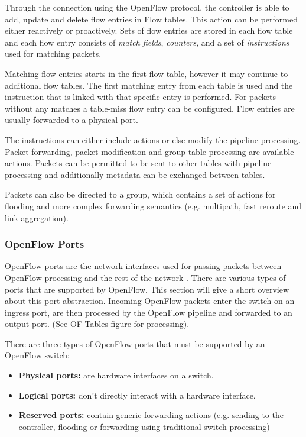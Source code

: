 Through the connection using the OpenFlow protocol, the controller is able to add, update and delete flow entries in Flow tables.  This action can be performed either reactively or proactively. Sets of flow entries are stored in each flow table and each flow entry consists of \textit{match fields}, \textit{counters}, and a set of \textit{instructions} used for matching packets.

Matching flow entries starts in the first flow table, however it may continue to additional flow tables. The first matching entry from each table is used and the instruction that is linked with that specific entry is performed. For packets without any matches a table-miss flow entry can be configured. Flow entries are usually forwarded to a physical port.

The instructions can either include actions or else modify the pipeline processing. Packet forwarding, packet modification and group table processing are available actions. Packets can be permitted to be sent to other tables with pipeline processing and additionally metadata can be exchanged between tables.

Packets can also be directed to a group, which contains a set of actions for flooding and more complex forwarding semantics (e.g. multipath, fast reroute and link aggregation).

\subsubsection{OpenFlow Ports}
OpenFlow ports are the network interfaces used for passing packets between OpenFlow processing and the rest of the network \cite{ofspecification}.
There are various types of ports that are supported by OpenFlow. This section will give a short overview about this port abstraction.
Incoming OpenFlow packets enter the switch on an ingress port, are then processed by the OpenFlow pipeline and forwarded to an output port. (See OF Tables figure for processing).

There are three types of OpenFlow ports that must be supported by an OpenFlow switch:
\begin{itemize}
\item \textbf{Physical ports:} are hardware interfaces on a switch.
\item \textbf{Logical ports:} don't directly interact  with a hardware interface.
\item \textbf{Reserved ports:} contain generic forwarding actions (e.g. sending to the controller, flooding or forwarding using traditional switch processing)
\end{itemize}

